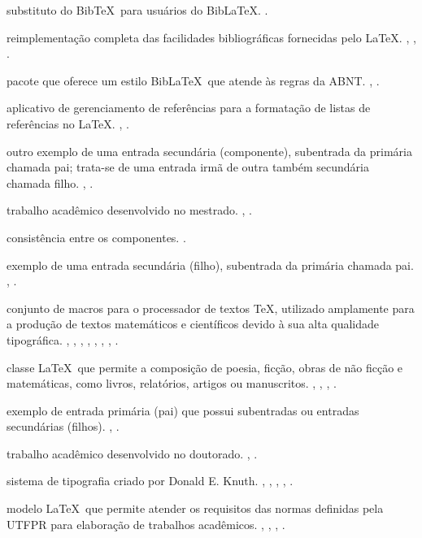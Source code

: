 \begin{Glossary}%
\item[biber] substituto do Bib\TeX\ para usuários do Bib\LaTeX.
  .
\item[Bib\LaTeX] reimplementação completa das facilidades bibliográficas fornecidas pelo \LaTeX.
  , , .
\item[Bib\LaTeX-abnt] pacote que oferece um estilo Bib\LaTeX\ que atende às regras da ABNT\@.
  , .
\item[Bib\TeX] aplicativo de gerenciamento de referências para a formatação de listas de referências no \LaTeX.
  , .
\glossaryspace%
\item[componente] outro exemplo de uma entrada secundária (componente), subentrada da primária chamada pai; trata-se de uma entrada irmã de outra também secundária chamada filho.
  , .
\glossaryspace%
\item[dissertação] trabalho acadêmico desenvolvido no mestrado.
  , .
\glossaryspace%
\item[equilíbrio da configuração] consistência entre os componentes.
  .
\glossaryspace%
\item[filho] exemplo de uma entrada secundária (filho), subentrada da primária chamada pai.
  , .
\glossaryspace%
\item[\LaTeX] conjunto de macros para o processador de textos \TeX, utilizado amplamente para a produção de textos matemáticos e científicos devido à sua alta qualidade tipográfica.
  , , , , , , , .
\glossaryspace%
\item[memoir] classe \LaTeX\ que permite a composição de poesia, ficção, obras de não ficção e matemáticas, como livros, relatórios, artigos ou manuscritos.
  , , , .
\glossaryspace%
\item[pai] exemplo de entrada primária (pai) que possui subentradas ou entradas secundárias (filhos).
  , .
\glossaryspace%
\item[tese] trabalho acadêmico desenvolvido no doutorado.
  , .
\item[\TeX] sistema de tipografia criado por Donald E. Knuth.
  , , , , .
\glossaryspace%
\item[\UTFPR-Thesis] modelo \LaTeX\ que permite atender os requisitos das normas definidas pela UTFPR para elaboração de trabalhos acadêmicos.
  , , , .
\end{Glossary}
